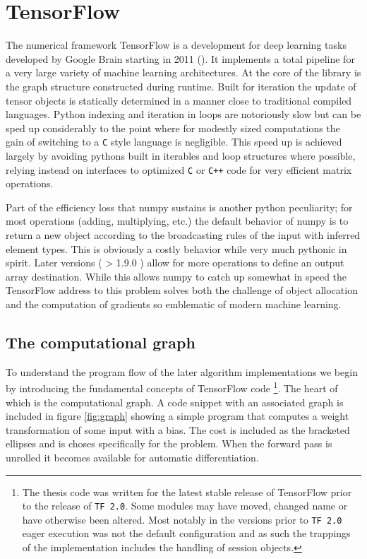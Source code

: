\section{TensorFlow}\label{sec:TensorFlow}

The numerical framework TensorFlow is a development for deep learning tasks developed by Google Brain starting in 2011 (\cite{tensorflow}). It implements a total pipeline for a very large variety of machine learning architectures. At the core of the library is the graph structure constructed during runtime. Built for iteration the update of tensor objects is statically determined in a manner close to traditional compiled languages. Python indexing and iteration in loops are notoriously slow but can be sped up considerably to the point where for modestly sized computations the gain of switching to a \lstinline{C} style language is negligible. This speed up is achieved largely by avoiding pythons built in iterables and loop structures where possible, relying instead on interfaces to optimized \lstinline{C} or \lstinline{C++} code for very efficient matrix operations.

Part of the efficiency loss that numpy sustains is another python peculiarity; for most operations (adding, multiplying, etc.) the default behavior of numpy is to return a new object according to the broadcasting rules of the input with inferred element types. This is obviously a costly behavior while very much pythonic in spirit. Later versions ( > 1.9.0 ) allow for more operations to define an output array destination. While this allows numpy to catch up somewhat in speed the TensorFlow address to this problem solves both the challenge of object allocation and the computation of gradients so emblematic of modern machine learning.

\subsection{The computational graph}

To understand the program flow of the later algorithm implementations we begin by introducing the fundamental concepts of TensorFlow code \footnote{The thesis code was written for the latest stable release of TensorFlow prior to the release of \lstinline{TF 2.0}. Some modules may have moved, changed name or have otherwise been altered. Most notably in the versions prior to \lstinline{TF 2.0} eager execution was not the default configuration and as such the trappings of the implementation includes the handling of session objects.}. The heart of which is the computational graph. A code snippet with an associated graph is included in figure \ref{fig:graph} showing a simple program that computes a weight transformation of some input with a bias. The cost is included as the bracketed ellipses and is choses specifically for the problem. When the forward pass is unrolled it becomes available for automatic differentiation. 

